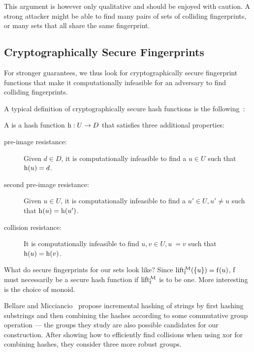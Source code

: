 \documentclass[conference]{IEEEtran}
\begin{document}
This argument is however only qualitative and should be enjoyed with caution. A strong attacker might be able to find many pairs of sets of colliding fingerprints, or many sets that all share the same fingerprint.

\subsection{Cryptographically Secure Fingerprints}

For stronger guarantees, we thus look for cryptographically secure fingerprint functions that make it computationally infeasible for an adversary to find colliding fingerprints.

A typical definition of cryptographically secure hash functions is the following~\cite{menezes2018handbook}:

\begin{definition}
A  is a hash function ${\operatorname{h}}: {U} \rightarrow {D}$ that satisfies three additional properties:

\begin{description}
  \item[pre-image resistance:] Given $d \in D$, it is computationally infeasible to find a $u \in U$ such that $\operatorname{h}(u) = d$.
  \item[second pre-image resistance:] Given $u \in U$, it is computationally infeasible to find a $u' \in U, u' \neq u$ such that $\operatorname{h}(u) = \operatorname{h}(u')$.
  \item[collision resistance:] It is computationally infeasible to find $u, v \in U, u ~= v$ such that $\operatorname{h}(u) = \operatorname{h}(v)$.
\end{description}
\end{definition}

What do secure fingerprints for our sets look like? Since $\operatorname{lift_{\operatorname{f}}^{\mathcal{M}}}(\{u\}) = \operatorname{f}(u)$, $\operatorname{f}$ must necessarily be a secure hash function if $\operatorname{lift_{\operatorname{f}}^{\mathcal{M}}}$ is to be one. More interesting is the choice of monoid.

Bellare and Micciancio~\cite{bellare1997new} propose incremental hashing of strings by first hashing substrings and then combining the hashes according to some commutative group operation --- the groups they study are also possible candidates for our construction. After showing how to efficiently find collisions when using xor for combining hashes, they consider three more robust groups.

\end{document}
